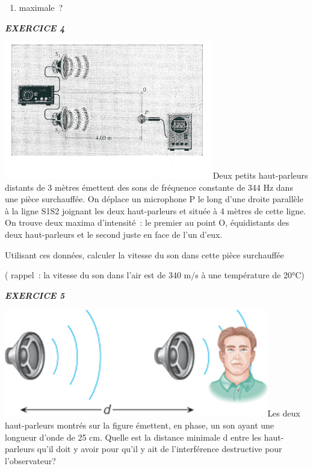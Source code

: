 {\begin{enumerate}
\def\labelenumi{\alph{enumi})}
\tightlist
\item
  maximale~?
\end{enumerate}

\emph{\textbf{EXERCICE 4}}

\includegraphics[width=9.146cm,height=5.973cm]{Pictures/100000010000062500000404B4675BF2C4CE1EEC.png}Deux
petits haut-parleurs distants de 3 mètres émettent des sons de fréquence
constante de 344 Hz dans une pièce surchauffée. On déplace un microphone
P le long d'une droite parallèle à la ligne S1S2 joignant les deux
haut-parleurs et située à 4 mètres de cette ligne. On trouve deux maxima
d'intensité~: le premier au point O, équidistants des deux haut-parleurs
et le second juste en face de l'un d'eux.

Utilisant ces données, calculer la vitesse du son dans cette pièce
surchauffée

( rappel~: la vitesse du son dans l'air est de 340 m/s à une température
de 20°C)

\emph{\textbf{EXERCICE 5}}

\includegraphics[width=11.546cm,height=4.688cm]{Pictures/1000000100000363000001603D3E7105AB252F90.png}Les
deux haut-parleurs montrés sur la figure émettent, en phase, un son
ayant une longueur d'onde de 25 cm. Quelle est la distance minimale d
entre les haut-parleurs qu'il doit y avoir pour qu'il y ait de
l'interférence destructive pour l'observateur?

}
